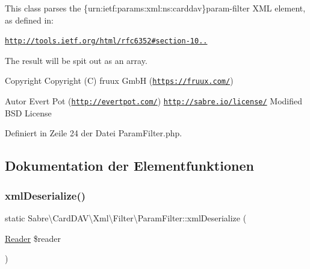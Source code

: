 This class parses the \{urn\+:ietf\+:params\+:xml\+:ns\+:carddav\}param-\/filter X\+ML element, as defined in\+:

\href{http://tools.ietf.org/html/rfc6352#section-10.5.2}{\tt http\+://tools.\+ietf.\+org/html/rfc6352\#section-\/10..}

The result will be spit out as an array.

\begin{DoxyCopyright}{Copyright}
Copyright (C) fruux GmbH (\href{https://fruux.com/}{\tt https\+://fruux.\+com/}) 
\end{DoxyCopyright}
\begin{DoxyAuthor}{Autor}
Evert Pot (\href{http://evertpot.com/}{\tt http\+://evertpot.\+com/})  \href{http://sabre.io/license/}{\tt http\+://sabre.\+io/license/} Modified B\+SD License 
\end{DoxyAuthor}


Definiert in Zeile 24 der Datei Param\+Filter.\+php.



\subsection{Dokumentation der Elementfunktionen}
\mbox{\label{class_sabre_1_1_card_d_a_v_1_1_xml_1_1_filter_1_1_param_filter_a33d44714654e11cbb4b0340c8135a4e7}} 
\subsubsection{\texorpdfstring{xml\+Deserialize()}{xmlDeserialize()}}
{\footnotesize\ttfamily static Sabre\textbackslash{}\+Card\+D\+A\+V\textbackslash{}\+Xml\textbackslash{}\+Filter\textbackslash{}\+Param\+Filter\+::xml\+Deserialize (\begin{DoxyParamCaption}\item[{\mbox{\hyperlink{class_sabre_1_1_xml_1_1_reader}{Reader}}}]{\$reader }\end{DoxyParamCaption})\hspace{0.3cm}{\ttfamily [static]}}

